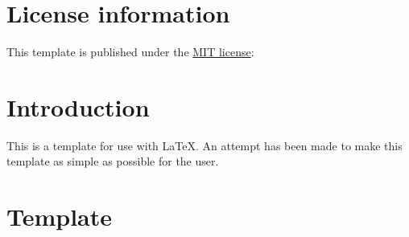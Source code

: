 

\section{License information}

This template is published under the \href{https://opensource.org/licenses/mit-license.php}{MIT license}:

\begin{figure}[H]
    \scriptsize
\end{figure}

\section{Introduction}

This is a template for use with \LaTeX{}. An attempt has been made to make
this template as simple as possible for the user.

\section{Template}
\label{sec:Template}

